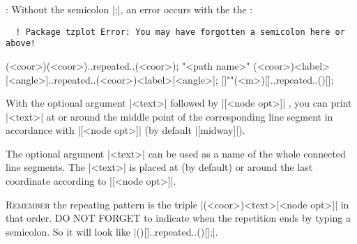 \remark: Without the semicolon |;|, an error occurs with the the :
  \begin{verbatim}
  ! Package tzplot Error: You may have forgotten a semicolon here or above!
  \end{verbatim}

\begin{tzdef}
\tzlines[<opt>](<coor>)(<coor>)..repeated..(<coor>);
\tzlines[<opt>]"<path name>"
        (<coor>){<label>}[<angle>]..repeated..(<coor>){<label>}[<angle>];
  []""(<m>){}[]..repeated..(){}[];
\end{tzdef}


\begin{tzcode}{.3}
\end{tzcode}

With the optional argument |{<text>}| followed by |[<node opt>]| , you can print |{<text>}| at or around the middle point of the corresponding line segment in accordance with |[<node opt>]| (by default |[midway]|).

\begin{tzcode}{.3}
\end{tzcode}

The optional argument |{<text>}|  can be used as a name of the whole connected line segments. The |{<text>}| is placed at (by default) or around the last coordinate according to |[<node opt>]|.

\begin{tzcode}{.3}
\end{tzcode}

\textsc{Remember} the repeating pattern is the triple |(<coor>){<text>}[<node opt>]| in that order.
DO NOT FORGET to indicate when the repetition ends by typing a semicolon. So it will look like |(){}[]..repeated..(){}[];|.

